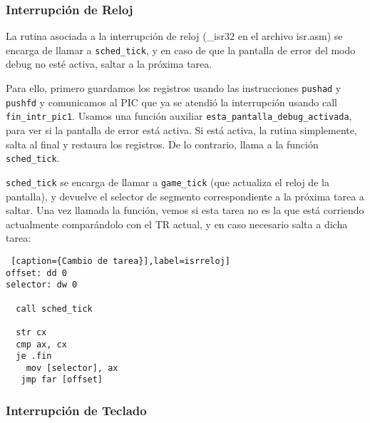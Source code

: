 	\subsubsection*{Interrupción de Reloj}

\par La rutina asociada a la interrupción de reloj (_isr32 en el archivo isr.asm) se encarga de llamar a \texttt{sched_tick}, y en caso de que la pantalla de error del modo debug no esté activa, saltar a la próxima tarea.
\par Para ello, primero guardamos los registros usando las instrucciones \texttt{pushad} y \texttt{pushfd} y comunicamos al PIC que ya se atendió la interrupción usando call \texttt{fin_intr_pic1}. Usamos una función auxiliar \texttt{esta_pantalla_debug_activada}, para ver si la pantalla de error está activa. Si está activa, la rutina simplemente, salta al final y restaura los registros. De lo contrario, llama a la función \texttt{sched_tick}.
\par \texttt{sched_tick} se encarga de llamar a \texttt{game_tick} (que actualiza el reloj de la pantalla), y devuelve el selector de segmento correspondiente a la próxima tarea a saltar. Una vez llamada la función, vemos si esta tarea no es la que está corriendo actualmente comparándolo con el TR actual, y en caso necesario salta a dicha tarea:

\begin{lstlisting} [caption={Cambio de tarea}],label=isrreloj] 
offset: dd 0
selector: dw 0

  call sched_tick
  
  str cx
  cmp ax, cx
  je .fin
    mov [selector], ax
   jmp far [offset]
\end{lstlisting}

	\subsubsection*{Interrupción de Teclado}

